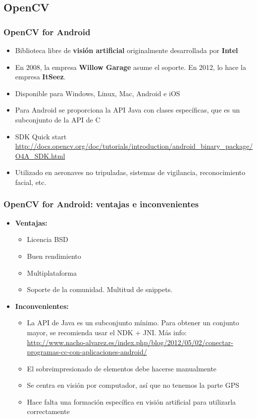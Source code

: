 \subsection*{OpenCV}
\frame
{
\frametitle{OpenCV for Android}
\begin{itemize}
 \item Biblioteca libre de \textbf{visión artificial} originalmente desarrollada por \textbf{Intel}
 \item En 2008, la empresa \textbf{Willow Garage} asume el soporte. En 2012, lo hace la empresa \textbf{ItSeez}.
 \item Disponible para Windows, Linux, Mac, Android e iOS
 \item Para Android se proporciona la API Java con clases específicas, que es un subconjunto de la API de C
 \item SDK Quick start\\ \url{http://docs.opencv.org/doc/tutorials/introduction/android_binary_package/O4A_SDK.html}
 \item Utilizado en aeronaves no tripuladas, sistemas de vigilancia, reconocimiento facial, etc.
\end{itemize}
}

\frame
{
\frametitle{OpenCV for Android: ventajas e inconvenientes}
\begin{itemize}
\item \textbf{Ventajas:}
  \begin{itemize}
   \item Licencia BSD
   \item Buen rendimiento
   \item Multiplataforma
   \item Soporte de la comunidad. Multitud de snippets.
  \end{itemize}

\item \textbf{Inconvenientes:}
  \begin{itemize}
   \item La API de Java es un subconjunto mínimo. Para obtener un conjunto mayor, se recomienda usar el NDK + JNI. Más info: \\
     \url{http://www.nacho-alvarez.es/index.php/blog/2012/05/02/conectar-programas-cc-con-aplicaciones-android/}
   \item El sobreimpresionado de elementos debe hacerse manualmente
   \item Se centra en visión por computador, así que no tenemos la parte GPS
   \item Hace falta una formación específica en visión artificial para utilizarla correctamente
  \end{itemize}

\end{itemize}
}
